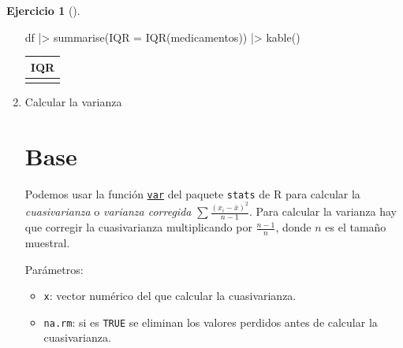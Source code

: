 \documentclass[
  spanish,
  a4paper,
]{scrreport}
\newenvironment{Shaded}{\begin{snugshade}}{\end{snugshade}}
\newcommand{\AttributeTok}[1]{\textcolor[rgb]{0.40,0.45,0.13}{#1}}
\newcommand{\FunctionTok}[1]{\textcolor[rgb]{0.28,0.35,0.67}{#1}}
\newcommand{\NormalTok}[1]{\textcolor[rgb]{0.00,0.23,0.31}{#1}}
\newcommand{\SpecialCharTok}[1]{\textcolor[rgb]{0.37,0.37,0.37}{#1}}
\providecommand{\tightlist}{%
  \setlength{\itemsep}{0pt}\setlength{\parskip}{0pt}}
\theoremstyle{definition}
\newtheorem{exercise}{Ejercicio}[chapter]
\theoremstyle{remark}
\begin{document}
\begin{exercise}[]
\begin{enumerate}
\begin{tcolorbox}
\begin{Shaded}
\begin{Highlighting}[]
\NormalTok{df }\SpecialCharTok{|\textgreater{}} \FunctionTok{summarise}\NormalTok{(}\AttributeTok{IQR =} \FunctionTok{IQR}\NormalTok{(medicamentos)) }\SpecialCharTok{|\textgreater{}}
    \FunctionTok{kable}\NormalTok{()}
\end{Highlighting}
\end{Shaded}

  \begin{longtable}[]{@{}r@{}}
  \toprule\noalign{}
  IQR \\
  \midrule\noalign{}
  \endhead
  \bottomrule\noalign{}
  \endlastfoot
  2 \\
  \end{longtable}

  \end{tcolorbox}
\item
  Calcular la varianza

  \begin{tcolorbox}[enhanced jigsaw, colback=white, coltitle=black, toprule=.15mm, rightrule=.15mm, opacitybacktitle=0.6, opacityback=0, bottomtitle=1mm, toptitle=1mm, titlerule=0mm, breakable, leftrule=.75mm, title=\textcolor{quarto-callout-tip-color}{\faLightbulb}\hspace{0.5em}{Solución}, arc=.35mm, left=2mm, bottomrule=.15mm, colframe=quarto-callout-tip-color-frame, colbacktitle=quarto-callout-tip-color!10!white]

  \section{Base}

  Podemos usar la función
  \href{https://www.rdocumentation.org/packages/stats/versions/3.6.2/topics/cor}{\texttt{var}}
  del paquete \texttt{stats} de R para calcular la \emph{cuasivarianza}
  o \emph{varianza corregida} \(\sum \frac{(x_i-\bar x)^2}{n-1}\). Para
  calcular la varianza hay que corregir la cuasivarianza multiplicando
  por \(\frac{n-1}{n}\), donde \(n\) es el tamaño muestral.

  Parámetros:

  \begin{itemize}
  \tightlist
  \item
    \texttt{x}: vector numérico del que calcular la cuasivarianza.
  \item
    \texttt{na.rm}: si es \texttt{TRUE} se eliminan los valores perdidos
    antes de calcular la cuasivarianza.
  \end{itemize}


\end{tcolorbox}
\end{enumerate}
\end{exercise}
\end{document}
